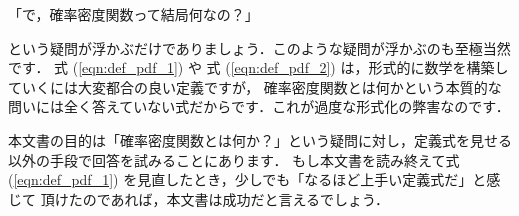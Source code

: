\begin{center}
    \gt 「で，確率密度関数って結局何なの？」
\end{center}

という疑問が浮かぶだけでありましょう．このような疑問が浮かぶのも至極当然です．
式 (\ref{eqn:def_pdf_1}) や 式 (\ref{eqn:def_pdf_2}) は，形式的に数学を構築していくには大変都合の良い定義ですが，
確率密度関数とは何かという本質的な問いには全く答えていない式だからです．これが過度な形式化の弊害なのです．

本文書の目的は「確率密度関数とは何か？」という疑問に対し，定義式を見せる以外の手段で回答を試みることにあります．
もし本文書を読み終えて式 (\ref{eqn:def_pdf_1}) を見直したとき，少しでも「なるほど上手い定義式だ」と感じて
頂けたのであれば，本文書は成功だと言えるでしょう．


